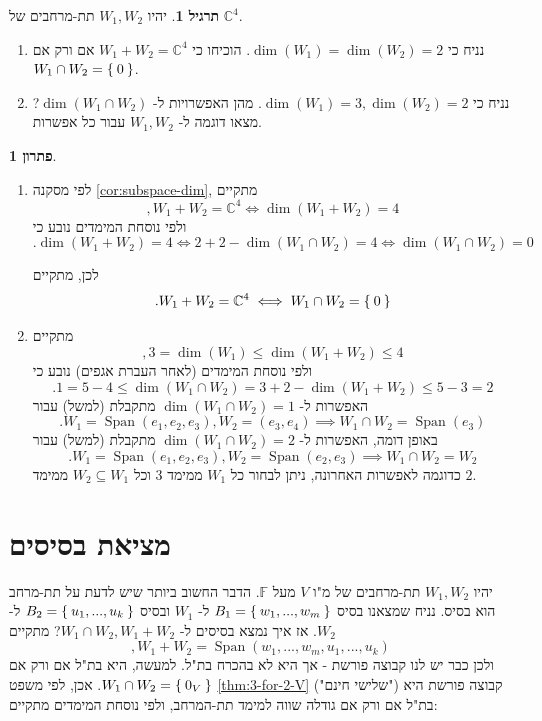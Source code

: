 \documentclass[12pt]{report}
\theoremstyle{plain}
\theoremstyle{definition}
\newtheorem{exercise}{תרגיל}[chapter]
\newtheorem*{solution}{פתרון}
\newcommand{\C}{\mathbb{C}}
\newcommand{\F}{\mathbb{F}}
\newcommand{\0}{\mathbf{0}}
\DeclareMathOperator{\Span}{Span}
\begin{document}
\begin{exercise}
יהיו
$W_1,W_2$
תת-מרחבים של 
$\C^4$.

\begin{enumerate}[label=\alph*.]
\item 
נניח כי 
$\dim(W_1)=\dim(W_2)=2$.
הוכיחו כי
$W_1+W_2=\C^4$
אם ורק אם
$W_1\cap W_2=\Set{0}$.


\item 
נניח כי 
$\dim(W_1)=3,\dim(W_2)=2$.
מהן האפשרויות ל-
$\dim(W_1\cap W_2)$?
מצאו דוגמה ל-
$W_1,W_2$
עבור כל אפשרות.


\end{enumerate}
\end{exercise}

\begin{solution}\
\begin{enumerate}[label=\alph*.]
\item 
לפי מסקנה
\ref{cor:subspace-dim},
מתקיים
$$
,W_1+W_2=\C^4 \iff \dim(W_1+W_2)=4
$$
ולפי נוסחת המימדים נובע כי
$$
.\dim(W_1+W_2)=4 \iff 2+2-\dim(W_1\cap W_2)=4 \iff \dim(W_1\cap W_2)=0
$$

לכן, מתקיים
$$
.W_1+W_2=\C^4 \iff W_1\cap W_2=\Set{0}
$$


\item 
מתקיים
$$
,3=\dim(W_1)\leq \dim(W_1+W_2)\leq 4
$$
ולפי נוסחת המימדים (לאחר העברת אגפים) נובע כי
$$
.1=5-4\leq \dim(W_1\cap W_2)=3+2-\dim(W_1+W_2)\leq 5-3=2
$$
האפשרות ל-
$\dim(W_1\cap W_2)=1$
מתקבלת (למשל) עבור 
$$
.W_1=\Span(e_1,e_2,e_3),W_2=(e_3,e_4) \implies W_1\cap W_2=\Span(e_3)
$$
באופן דומה, האפשרות ל-
$\dim(W_1\cap W_2)=2$
מתקבלת (למשל) עבור 
$$
.W_1=\Span(e_1,e_2,e_3),W_2=\Span(e_2,e_3) \implies W_1\cap W_2=W_2
$$
כדוגמה לאפשרות האחרונה, ניתן לבחור כל 
$W_1$
ממימד 
$3$
וכל
$W_2\subseteq W_1$
ממימד 
$2$.


\end{enumerate}
\end{solution}

\section{מציאת בסיסים}

יהיו 
$W_1,W_2$
תת-מרחבים של מ"ו
$V$
מעל 
$\F$.
הדבר החשוב ביותר שיש לדעת על תת-מרחב הוא בסיס. נניח שמצאנו בסיס
$B_1=\Set{w_1,...,w_m}$
ל-
$W_1$
ובסיס
$B_2=\Set{u_1,...,u_k}$
ל-
$W_2$.
אז איך נמצא בסיסים ל-
$W_1\cap W_2,W_1+W_2$?
מתקיים
$$
,W_1+W_2=\Span(w_1,...,w_m,u_1,...,u_k)
$$
ולכן כבר יש לנו קבוצה פורשת - אך היא לא בהכרח בת"ל. למעשה, היא בת"ל אם ורק אם 
$W_1\cap W_2= \Set{0_V}$.
אכן, לפי משפט
\ref{thm:3-for-2-V}
("שלישי חינם")
קבוצה פורשת היא בת"ל אם ורק אם גודלה שווה למימד תת-המרחב, ולפי נוסחת המימדים מתקיים:
\end{document}
